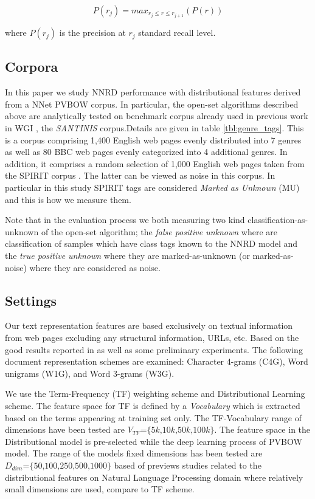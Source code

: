 \begin{equation}
	P(r_j)=max_{r_j \leqslant r \leqslant r_{j+1}}(P(r))
\end{equation}

\noindent
where $P(r_j)$ is the precision at $r_j$ standard recall level.

\subsection{Corpora}\label{chap:word_embeddings:sec:corpora}
In this paper we study NNRD performance with distributional features derived from a NNet PVBOW corpus. In particular, the open-set algorithms described above are analytically tested on benchmark corpus already used in previous work in WGI , the \textit{SANTINIS} \parencite{mehler2010genres_on_web} corpus.Details are given in table \ref{tbl:genre_tags}. This is a corpus comprising 1,400 English web pages evenly distributed into 7 genres as well as 80 BBC web pages evenly categorized into 4 additional genres. In addition, it comprises a random selection of 1,000 English web pages taken from the SPIRIT corpus \parencite{joho2004spirit}. The latter can be viewed as noise in this corpus. In particular in this study SPIRIT tags are considered \textit{Marked as Unknown} (MU) and this is how we measure them.

Note that in the evaluation process we both measuring two kind classification-as-unknown of the open-set algorithm; the \textit{false positive unknown} where are classification of samples which have class tags known to the NNRD model and the \textit{true positive unknown} where they are marked-as-unknown (or marked-as-noise) where they are considered as noise.

\subsection{Settings}\label{chap:word_embeddings:sec:evaluation_measures}
Our text representation features are based exclusively on textual information from web pages excluding any structural information, URLs, etc. Based on the good results reported in  as well as some preliminary experiments. The following document representation schemes are examined: Character 4-grams (C4G), Word unigrams (W1G), and Word 3-grams (W3G).

We use the Term-Frequency (TF) weighting scheme and Distributional Learning scheme. The feature space for TF is defined by a \textit{Vocabulary} which is extracted based on the terms appearing at training set only. The TF-Vocabulary range of dimensions have been tested are $V_{TF}\textit{=\{5k,10k,50k,100k\}}$. The feature space in the Distributional model is pre-selected while the deep learning process of PVBOW model. The range of the models fixed dimensions has been tested are $D_{dim}\textit{=\{50,100,250,500,1000\}}$ based of previews studies related to the distributional features on Natural Language Processing domain where relatively small dimensions are used, compare to TF scheme.

